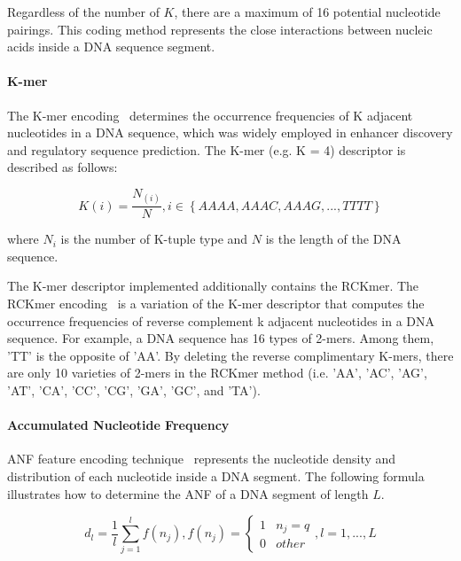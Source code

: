 Regardless of the number of $K$, there are a maximum of 16 potential nucleotide pairings. This coding method represents the close interactions between nucleic acids inside a \gls{DNA} sequence segment.

\paragraph{K-mer}

The K-mer encoding~\cite{Manavalan20194mCpred-EL:Genome,Huang2018BERMP:Approach} determines the occurrence frequencies of K adjacent nucleotides in a \gls{DNA} sequence, which was widely employed in enhancer discovery and regulatory sequence prediction. The K-mer (e.g. K = 4) descriptor is described as follows:

\begin{equation}\label{eq:K-mer}
    K(i) = \frac{N_{(i)}}{N}, i \in \left\{AAAA, AAAC, AAAG,...,TTTT\right\}
\end{equation}

where $N_{i}$ is the number of K-tuple type and $N$ is the length of the \gls{DNA} sequence.

The K-mer descriptor implemented additionally contains the \gls{RCKmer}. The \gls{RCKmer} encoding~\cite{Chen2019ILearn:Data} is a variation of the K-mer descriptor that computes the occurrence frequencies of reverse complement k adjacent nucleotides in a \gls{DNA} sequence. For example, a \gls{DNA} sequence has 16 types of 2-mers. Among them, 'TT' is the opposite of 'AA'. By deleting the reverse complimentary K-mers, there are only 10 varieties of 2-mers in the \gls{RCKmer} method (i.e. 'AA', 'AC', 'AG', 'AT', 'CA', 'CC', 'CG', 'GA', 'GC', and 'TA').

\paragraph{Accumulated Nucleotide Frequency}

\gls{ANF} feature encoding technique~\cite{Feng2019IDNA6mA-PseKNC:PseKNC} represents the nucleotide density and distribution of each nucleotide inside a \gls{DNA} segment. The following formula illustrates how to determine the \gls{ANF} of a \gls{DNA} segment of length $L$.

\begin{equation}\label{eq:ANF}
    d_{l} = \frac{1}{l}\sum_{j=1}^{l}f(n_{j}), f(n_{j}) = \begin{cases}1 & n_{j} = q\\0 & other\end{cases}, l = 1,...,L
\end{equation}

